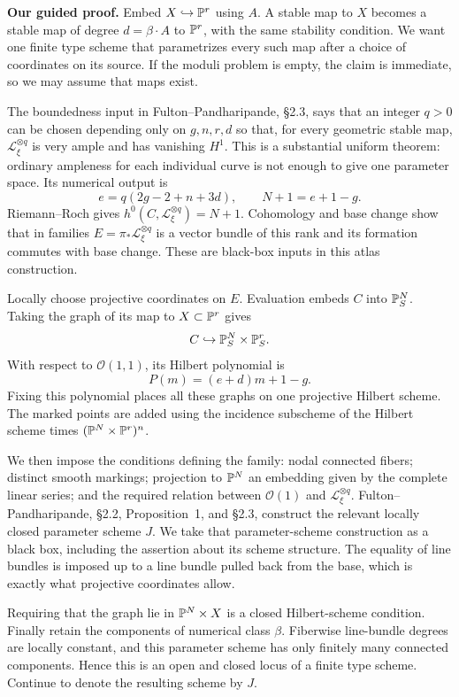 \noindent\textbf{Our guided proof.}
Embed $X\hookrightarrow\mathbb P^r$ using $A$. A stable map to $X$ becomes a stable map of degree $d=\beta\cdot A$ to $\mathbb P^r$, with the same stability condition. We want one finite type scheme that parametrizes every such map after a choice of coordinates on its source. If the moduli problem is empty, the claim is immediate, so we may assume that maps exist.

The boundedness input in Fulton--Pandharipande, \S2.3, says that an integer $q>0$ can be chosen depending only on $g,n,r,d$ so that, for every geometric stable map, $\mathcal L_\xi^{\otimes q}$ is very ample and has vanishing $H^1$. This is a substantial uniform theorem: ordinary ampleness for each individual curve is not enough to give one parameter space. Its numerical output is
\[
 e=q(2g-2+n+3d),\qquad N+1=e+1-g.
\]
Riemann--Roch gives $h^0(C,\mathcal L_\xi^{\otimes q})=N+1$. Cohomology and base change show that in families $E=\pi_*\mathcal L_\xi^{\otimes q}$ is a vector bundle of this rank and its formation commutes with base change. These are black-box inputs in this atlas construction.

Locally choose projective coordinates on $E$. Evaluation embeds $C$ into $\mathbb P^N_S$. Taking the graph of its map to $X\subset\mathbb P^r$ gives
\[
 C\hookrightarrow\mathbb P^N_S\times\mathbb P^r_S.
\]
With respect to $\mathcal O(1,1)$, its Hilbert polynomial is
\[
 P(m)=(e+d)m+1-g.
\]
Fixing this polynomial places all these graphs on one projective Hilbert scheme. The marked points are added using the incidence subscheme of the Hilbert scheme times $(\mathbb P^N\times\mathbb P^r)^n$.

We then impose the conditions defining the family: nodal connected fibers; distinct smooth markings; projection to $\mathbb P^N$ an embedding given by the complete linear series; and the required relation between $\mathcal O(1)$ and $\mathcal L_\xi^{\otimes q}$. Fulton--Pandharipande, \S2.2, Proposition~1, and \S2.3, construct the relevant locally closed parameter scheme $J$. We take that parameter-scheme construction as a black box, including the assertion about its scheme structure. The equality of line bundles is imposed up to a line bundle pulled back from the base, which is exactly what projective coordinates allow.

Requiring that the graph lie in $\mathbb P^N\times X$ is a closed Hilbert-scheme condition. Finally retain the components of numerical class $\beta$. Fiberwise line-bundle degrees are locally constant, and this parameter scheme has only finitely many connected components. Hence this is an open and closed locus of a finite type scheme. Continue to denote the resulting scheme by $J$.

